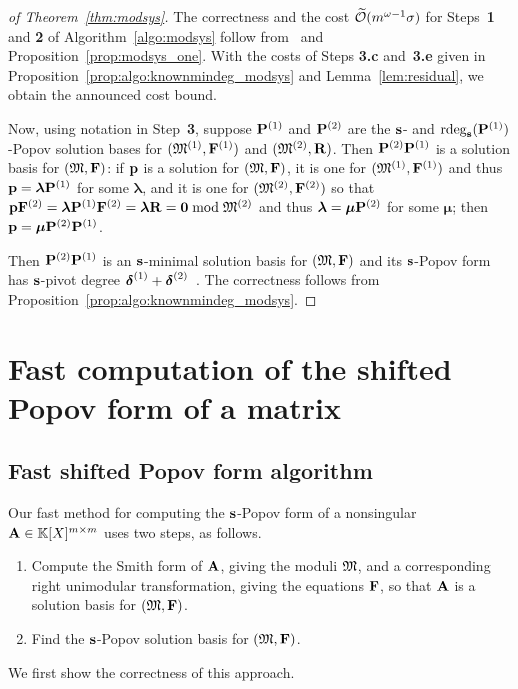 \documentclass[preprint]{sig-alternate-05-2015}
\begin{document}
\begin{proof}[of Theorem~\ref{thm:modsys}]
The correctness and the cost $\widetilde{\mathcal{O}}(m^{\omega-1} \sigma)$ for
Steps~\textbf{1} and \textbf{2} of Algorithm~\ref{algo:modsys} follow
from~\cite[Theorem~1.4]{JeNeScVi15} and Proposition~\ref{prop:modsys_one}. With
the costs of Steps \textbf{3.c} and~\textbf{3.e} given in
Proposition~\ref{prop:algo:knownmindeg_modsys} and Lemma~\ref{lem:residual}, we
obtain the announced cost bound.

Now, using notation in Step~\textbf{3}, suppose $\msb^{(1)}$ and $\msb^{(2)}$
are the $\mathbf{s}$- and $\rdeg[\shifts]{\msb^{(1)}}$-Popov solution bases for
$(\Modulus^{(1)},\sys^{(1)})$ and $(\Modulus^{(2)},\mat{R})$. Then
$\msb^{(2)}\msb^{(1)}$ is a solution basis for $(\Modulus,\sys)$: if
$\row{p}$ is a solution for $(\Modulus,\sys)$, it is one for
$(\Modulus^{(1)},\sys^{(1)})$ and thus $\row{p} = \boldsymbol{\lambda}
\msb^{(1)}$ for some $\boldsymbol{\lambda}$, and it is one for
$(\Modulus^{(2)},\sys^{(2)})$ so that $\row{p} \sys^{(2)} =
\boldsymbol{\lambda} \msb^{(1)} \sys^{(2)} = \boldsymbol{\lambda} \mat{R} =
\row{0} \bmod \Modulus^{(2)}$ and thus $\boldsymbol{\lambda} =
\boldsymbol{\mu} \msb^{(2)}$ for some $\boldsymbol{\mu}$; then $\row{p} =
\boldsymbol{\mu} \msb^{(2)}\msb^{(1)}$.

Then $\msb^{(2)}\msb^{(1)}$ is an $\mathbf{s}$-minimal solution basis for
$(\Modulus,\sys)$ and its $\mathbf{s}$-Popov form has $\mathbf{s}$-pivot degree
$\boldsymbol{\delta}^{(1)} + \boldsymbol{\delta}^{(2)}$~\cite[Section 3]{JeNeScVi16}. The correctness
follows from Proposition~\ref{prop:algo:knownmindeg_modsys}.
\end{proof}

\section{Fast computation of the shifted Popov form of a matrix}
\label{sec:popov}

\vspace{-0.15cm}
\subsection{Fast shifted Popov form algorithm}
\label{subsec:algo:popov}

Our fast method for computing the $\mathbf{s}$-Popov form of a nonsingular
$\mat{A} \in \polMatSpace$ uses two steps, as follows.
\vspace{-0.15cm}
\begin{enumerate}[{\bf 1.}]
      \setlength{\itemsep}{0cm}
  \item Compute the Smith form of $\mat{A}$, giving the moduli $\mathfrak{M}$,
    and a corresponding right unimodular transformation, giving the equations
    $\sys$, so that $\mat{A}$ is a solution basis for $(\Modulus,\sys)$.
  \item Find the $\mathbf{s}$-Popov solution basis for $(\Modulus,\sys)$.
\end{enumerate}
We first show the correctness of this approach.
\end{document}

